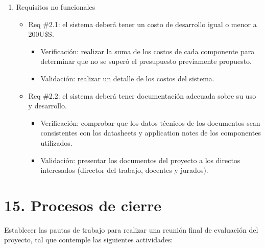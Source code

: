 \documentclass[
11pt, %
]{plan}
\begin{document}
\begin{enumerate}
\begin{itemize}
		\end{itemize}
		
	\item Requisitos no funcionales
	
		\begin{itemize}
			\item Req \#2.1: el sistema deberá tener un costo de desarrollo igual o menor a 200U\$S.

			\begin{itemize}
				\item Verificación: realizar la suma de los costos de cada componente para determinar que no se superó el presupuesto previamente propuesto.
				\item Validación: realizar un detalle de los costos del sistema.
			\end{itemize}

		\end{itemize}
		
		\begin{itemize}
			\item Req \#2.2: el sistema deberá tener documentación adecuada sobre su uso y desarrollo.

			\begin{itemize}
				\item Verificación: comprobar que los datos técnicos de los documentos sean consistentes con los datasheets y application notes de los componentes utilizados.
				\item Validación: presentar los documentos del proyecto a los directos interesados (director del trabajo, docentes y jurados).
			\end{itemize}

		\end{itemize}

\end{enumerate}

\section{15. Procesos de cierre}   
\label{sec:cierre}

Establecer las pautas de trabajo para realizar una reunión final de evaluación del proyecto, tal que contemple las siguientes actividades:
\end{document}
